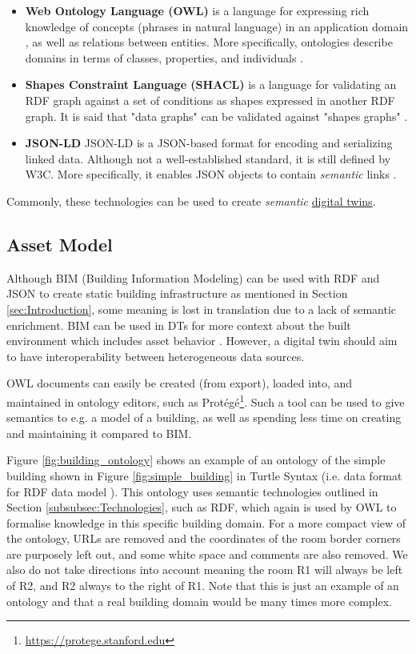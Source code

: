 \documentclass{article}
\begin{document}
\begin{itemize}
    \item \textbf{Web Ontology Language (OWL)} is a language for expressing rich knowledge of concepts (phrases in natural language) in an application domain \cite{szolovits_overview_1977}, as well as relations between entities. More specifically, ontologies describe domains in terms of classes, properties, and individuals \cite{bechhofer_owl_2009}.

    \item \textbf{Shapes Constraint Language (SHACL)} is a language for validating an RDF graph against a set of conditions as shapes expressed in another RDF graph. It is said that "data graphs" can be validated against "shapes graphs" \cite{noauthor_shapes_nodate}.
    
    \item \textbf{JSON-LD} JSON-LD is a JSON-based format for encoding and serializing linked data. Although not a well-established standard, it is still defined by W3C.  More specifically, it enables JSON objects to contain \emph{semantic} links \cite{noauthor_json-based_nodate}.
\end{itemize}

Commonly, these technologies can be used to create \emph{semantic} \hyperref[subsec:DigitalTwins]{digital twins}.

\subsection{Asset Model}\label{subsec:AssetModel}
Although BIM (Building Information Modeling) can be used with RDF and JSON to create static building infrastructure as mentioned in Section \ref{sec:Introduction}, some meaning is lost in translation due to a lack of semantic enrichment. BIM can be used in DTs for more context about the built environment which includes asset behavior \cite{godager_concept_2021}. However, a digital twin should aim to have interoperability between heterogeneous data sources.

OWL documents can easily be created (from export), loaded into, and maintained in ontology editors, such as Protégé\footnote{\url{https://protege.stanford.edu}}. Such a tool can be used to give semantics to e.g. a model of a building, as well as spending less time on creating and maintaining it compared to BIM. 

Figure \ref{fig:building_ontology} shows an example of an ontology of the simple building shown in Figure \ref{fig:simple_building} in Turtle Syntax (i.e. data format for RDF data model \cite{noauthor_terse_nodate}). This ontology uses semantic technologies outlined in Section \ref{subsubsec:Technologies}, such as RDF, which again is used by OWL to formalise knowledge in this specific building domain. For a more compact view of the ontology, URLs are removed and the coordinates of the room border corners are purposely left out, and some white space and comments are also removed. We also do not take directions into account meaning the room R1 will always be left of R2, and R2 always to the right of R1. Note that this is just an example of an ontology and that a real building domain would be many times more complex.
\end{document}
